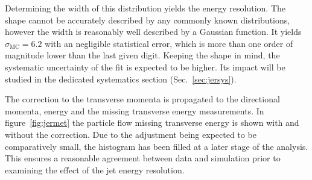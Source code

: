   \noindent Determining the width of this distribution yields the energy resolution. The shape cannot be accurately described by any commonly known distributions, however the width is reasonably well described by a Gaussian function. It yields $\sigma_{\text{MC}} = 6.2$ with an negligible statistical error, which is more than one order of magnitude lower than the last given digit. Keeping the shape in mind, the systematic uncertainty of the fit is expected to be higher. Its impact will be studied in the dedicated systematics section (Sec.~\ref{sec:jersys}).

The correction to the transverse momenta is propagated to the directional momenta, energy and the missing transverse energy measurements. In figure~\ref{fig:jermet} the particle flow missing transverse energy is shown with and without the correction. Due to the adjustment being expected to be comparatively small, the histogram has been filled at a later stage of the analysis. This ensures a reasonable agreement between data and simulation prior to examining the effect of the jet energy resolution.

